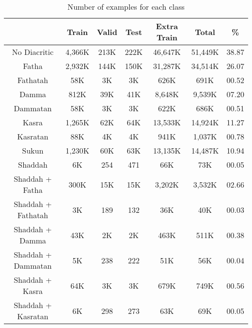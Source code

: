 \documentclass[11pt,a4paper]{article}
\begin{document}
\begin{table*}
\centering
\caption{Number of examples for each class}
\label{tab:num_examples}
\begin{tabular}{c|c|c|c|c|c|c|}
\cline{2-7}
                                         & Train  & Valid & Test & Extra Train & Total   & \%    \\ \hline
\multicolumn{1}{|c|}{No Diacritic}       & 4,366K & 213K  & 222K & 46,647K     & 51,449K & 38.87 \\ \hline
\multicolumn{1}{|c|}{Fatha}              & 2,932K & 144K  & 150K & 31,287K     & 34,514K & 26.07 \\ \hline
\multicolumn{1}{|c|}{Fathatah}  & 58K & 3K & 3K & 626K & 691K & 00.52 \\ \hline
\multicolumn{1}{|c|}{Damma}              & 812K   & 39K   & 41K  & 8,648K      & 9,539K  & 07.20 \\ \hline
\multicolumn{1}{|c|}{Dammatan} & 58K & 3K & 3K & 622K & 686K & 00.51 \\ \hline
\multicolumn{1}{|c|}{Kasra}              & 1,265K & 62K   & 64K  & 13,533K     & 14,924K & 11.27 \\ \hline
\multicolumn{1}{|c|}{Kasratan} & 88K & 4K & 4K & 941K & 1,037K & 00.78 \\ \hline
\multicolumn{1}{|c|}{Sukun}              & 1,230K & 60K   & 63K  & 13,135K     & 14,487K & 10.94 \\ \hline
\multicolumn{1}{|c|}{Shaddah} & 6K & 254 & 471 & 66K & 73K & 00.05 \\ \hline
\multicolumn{1}{|c|}{Shaddah + Fatha}    & 300K   & 15K   & 15K  & 3,202K      & 3,532K  & 02.66 \\ \hline
\multicolumn{1}{|c|}{Shaddah + Fathatah} & 3K & 189 & 132 & 36K & 40K & 00.03 \\ \hline
\multicolumn{1}{|c|}{Shaddah + Damma} & 43K & 2K & 2K & 463K & 511K & 00.38 \\ \hline
\multicolumn{1}{|c|}{Shaddah + Dammatan} & 5K & 238 & 222 & 51K & 56K & 00.04 \\ \hline
\multicolumn{1}{|c|}{Shaddah + Kasra} & 64K & 3K & 3K & 679K & 749K & 00.56 \\ \hline
\multicolumn{1}{|c|}{Shaddah + Kasratan} & 6K & 298 & 273 & 63K & 69K & 00.05 \\ \hline
\end{tabular}
\end{table*}
\end{document}
